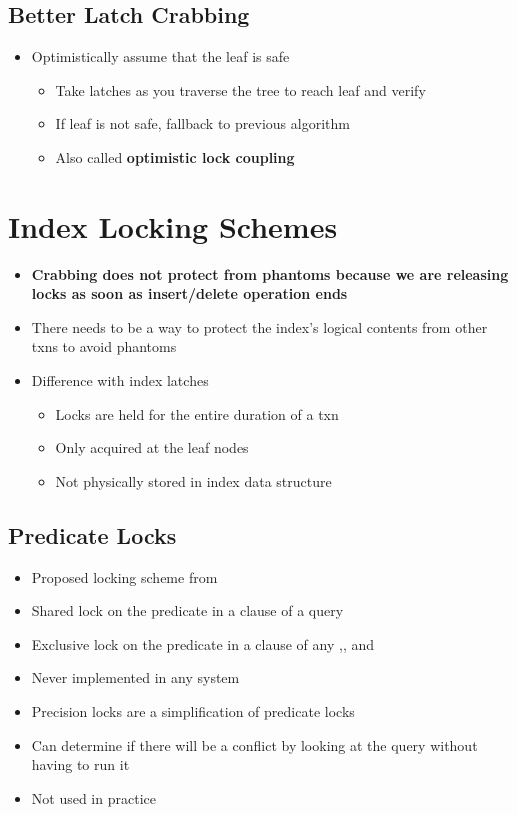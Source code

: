 \documentclass[11pt]{article}
\begin{document}
\subsection*{Better Latch Crabbing~\cite{a1-bayer}}
    \begin{itemize}
        \item Optimistically assume that the leaf is safe
        \begin{itemize}
            \item Take  latches as you traverse the tree to reach leaf and verify
            \item If leaf is not safe, fallback to previous algorithm
            \item Also called \textbf{optimistic lock coupling}
        \end{itemize}
    \end{itemize}

\section{Index Locking Schemes}
\begin{itemize}
    \item \textbf{Crabbing does not protect from phantoms because we are releasing locks as soon as insert/delete operation ends}
    \item There needs to be a way to protect the index's logical contents from other txns to avoid phantoms
    \item Difference with index latches
    \begin{itemize}
        \item Locks are held for the entire duration of a txn
        \item Only acquired at the leaf nodes
        \item Not physically stored in index data structure
    \end{itemize}
\end{itemize}
\subsection*{\textbf{Predicate Locks}~\cite{p624-eswaran}}
    \begin{itemize}
        \item Proposed locking scheme from 
        \item Shared lock on the predicate in a  clause of a  query
        \item Exclusive lock on the predicate in a  clause of any ,, and 
        \item Never implemented in any system
        \item Precision locks are a simplification of predicate locks
        \item Can determine if there will be a conflict by looking at the query without having to run it
        \item Not used in practice
    \end{itemize}
\end{document}
